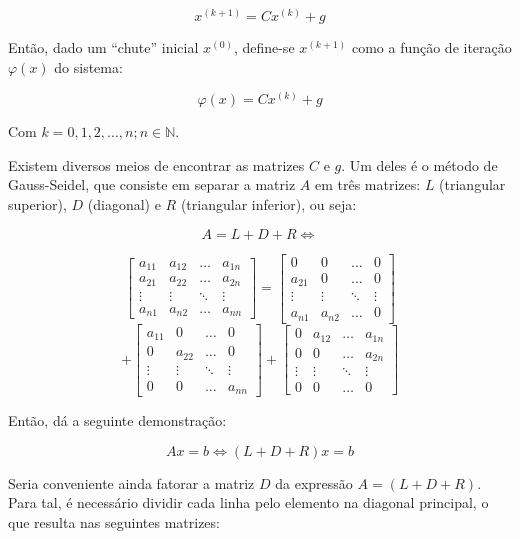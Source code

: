 \documentclass[twocolumn, 10pt]{extarticle}
\begin{document}
\[
x^{(k+1)} = Cx^{(k)}+g
\]

Então, dado um ``chute'' inicial $x^{(0)}$, define-se $x^{(k+1)}$ como a função de iteração $\varphi(x)$ do sistema:

\[
\varphi(x) = Cx^{(k)}+g
\]

Com $k = 0, 1, 2, \dots, n; n \in \mathbb{N} $.

Existem diversos meios de encontrar as matrizes $C$ e $g$. Um deles é o método de Gauss-Seidel, que consiste em separar a matriz $A$ em três matrizes: $L$ (triangular superior), $D$ (diagonal) e $R$ (triangular inferior), ou seja:

\[A = L + D + R \iff\]

\[
\begin{bmatrix}
a_{11} & a_{12} & \dots & a_{1n} \\
a_{21} & a_{22} & \dots & a_{2n} \\
\vdots & \vdots & \ddots & \vdots \\
a_{n1} & a_{n2} & \dots & a_{nn}  
\end{bmatrix}
=
\begin{bmatrix}
0 & 0 & \dots & 0 \\
a_{21} & 0 & \dots & 0 \\
\vdots & \vdots & \ddots & \vdots \\
a_{n1} & a_{n2} & \dots & 0  
\end{bmatrix}
\]
\[
+
\begin{bmatrix}
a_{11} & 0 & \dots & 0 \\
0 & a_{22} & \dots & 0 \\
\vdots & \vdots & \ddots & \vdots \\
0 & 0 & \dots & a_{nn}  
\end{bmatrix}
+
\begin{bmatrix}
0 & a_{12} & \dots & a_{1n} \\
0 & 0 & \dots & a_{2n} \\
\vdots & \vdots & \ddots & \vdots \\
0 & 0 & \dots & 0 
\end{bmatrix}
\]

Então, \cite[p. 164]{ruggiero} dá a seguinte demonstração:

\[
Ax = b \iff (L + D + R)x = b
\]

Seria conveniente ainda fatorar a matriz $D$ da expressão $A = (L + D + R)$. Para tal, é necessário dividir cada linha pelo elemento na diagonal principal, o que resulta nas seguintes matrizes:
\end{document}
